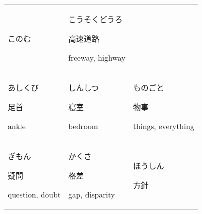 \documentclass[12pt, a4j, landscape, dvipdfmx]{utarticle}
\begin{document}
\begin{minipage}[t][0pt]{\linewidth }
\begin{tabular}{||p{5.5cm}||p{5.5cm}||p{5.5cm}||}
このむ}\newline \rule{0pt}{3ex} \hspace*{.4cm} {\small 好む}\newline \rule{0pt}{3ex} \hspace*{.425cm} {\small like, be fond of}&\rule{0pt}{3ex} \hspace*{-.4cm} {\LARGE こうそくどうろ}\newline \rule{0pt}{3ex} \hspace*{.4cm} {\small 高速道路}\newline \rule{0pt}{3ex} \hspace*{.425cm} {\small freeway, highway}\tabularnewline \hhline{|:=::=::=:|} \rule{0pt}{3ex} \hspace*{-.4cm} {\LARGE あしくび}\newline \rule{0pt}{3ex} \hspace*{.4cm} {\small 足首}\newline \rule{0pt}{3ex} \hspace*{.425cm} {\small ankle}&\rule{0pt}{3ex} \hspace*{-.4cm} {\LARGE しんしつ}\newline \rule{0pt}{3ex} \hspace*{.4cm} {\small 寝室}\newline \rule{0pt}{3ex} \hspace*{.425cm} {\small bedroom}&\rule{0pt}{3ex} \hspace*{-.4cm} {\LARGE ものごと}\newline \rule{0pt}{3ex} \hspace*{.4cm} {\small 物事}\newline \rule{0pt}{3ex} \hspace*{.425cm} {\small things, everything}\tabularnewline \hhline{|:=::=::=:|} \rule{0pt}{3ex} \hspace*{-.4cm} {\LARGE ぎもん}\newline \rule{0pt}{3ex} \hspace*{.4cm} {\small 疑問}\newline \rule{0pt}{3ex} \hspace*{.425cm} {\small question, doubt}&\rule{0pt}{3ex} \hspace*{-.4cm} {\LARGE かくさ}\newline \rule{0pt}{3ex} \hspace*{.4cm} {\small 格差}\newline \rule{0pt}{3ex} \hspace*{.425cm} {\small gap, disparity}&\rule{0pt}{3ex} \hspace*{-.4cm} {\LARGE ほうしん}\newline \rule{0pt}{3ex} \hspace*{.4cm} {\small 方針}\newline \rule{0pt}{3ex} \hspace*{.425cm} {\small course, 
\end{tabular}
\end{minipage}
\end{document}
